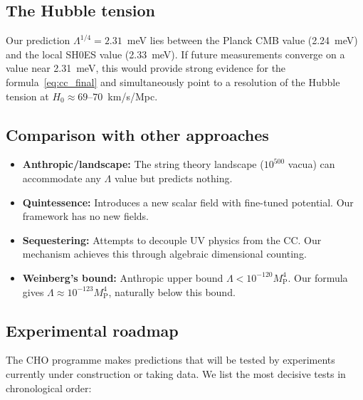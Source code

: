 \documentclass[12pt,a4paper]{article}
\theoremstyle{definition}
\theoremstyle{remark}
\newcommand{\MP}{M_{\mathrm{P}}}
\begin{document}
\subsection{The Hubble tension}

Our prediction $\Lambda^{1/4} = 2.31$~meV lies between the Planck CMB 
value (2.24~meV) and the local SH0ES value (2.33~meV). If future 
measurements converge on a value near 2.31~meV, this would provide 
strong evidence for the formula~\eqref{eq:cc_final} and simultaneously 
point to a resolution of the Hubble tension at $H_0 \approx 69$--$70$~km/s/Mpc.

\subsection{Comparison with other approaches}

\begin{itemize}
\item \textbf{Anthropic/landscape:} The string theory landscape 
($10^{500}$ vacua) can accommodate any $\Lambda$ value but predicts nothing.
\item \textbf{Quintessence:} Introduces a new scalar field with fine-tuned 
potential. Our framework has no new fields.
\item \textbf{Sequestering:} Attempts to decouple UV physics from the CC. 
Our mechanism achieves this through algebraic dimensional counting.
\item \textbf{Weinberg's bound:} Anthropic upper bound $\Lambda < 10^{-120}\MP^4$. 
Our formula gives $\Lambda \approx 10^{-123}\MP^4$, naturally below this bound.
\end{itemize}

\subsection{Experimental roadmap}

The CHO programme makes predictions that will be tested by experiments 
currently under construction or taking data. We list the most decisive 
tests in chronological order:
\end{document}
